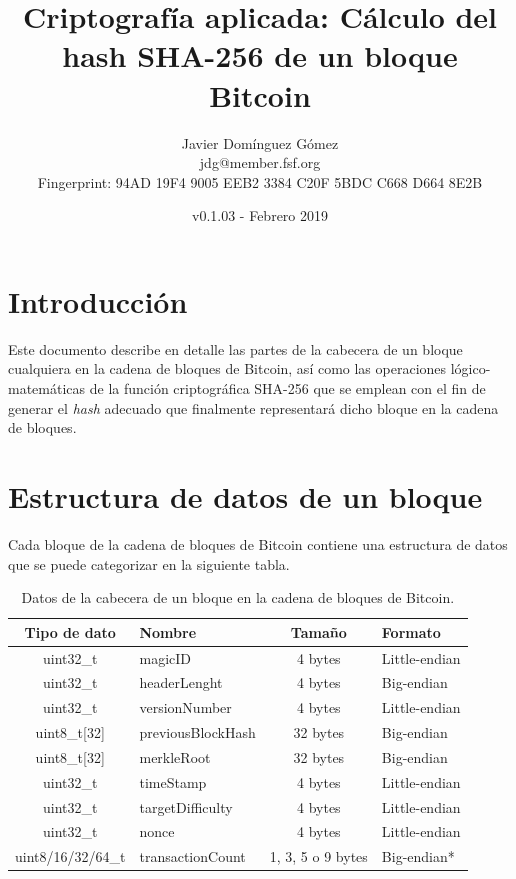 \documentclass{article}
\title{\textbf{Criptografía aplicada: Cálculo del hash SHA-256 de un bloque Bitcoin}}
\author{Javier Domínguez Gómez \\
\small{jdg@member.fsf.org} \\
\small{Fingerprint: 94AD 19F4 9005 EEB2 3384 C20F 5BDC C668 D664 8E2B}}
\date{v0.1.03 - Febrero 2019}
\begin{document}
\maketitle

\tableofcontents{}

\section{Introducción}
    Este documento describe en detalle las partes de la cabecera de un bloque cualquiera en la cadena de bloques de Bitcoin, así como las operaciones lógico-matemáticas de la función criptográfica SHA-256 que se emplean con el fin de generar el \textit{hash} adecuado que finalmente representará dicho bloque en la cadena de bloques.

\section{Estructura de datos de un bloque}
    \vspace{3mm}
    Cada bloque de la cadena de bloques de Bitcoin contiene una estructura de datos que se puede categorizar en la siguiente tabla.
    \begin{table}[H]
    \centering
    \begin{tabular}{| c | l | c | l |} 
        \hline
        Tipo de dato & Nombre & Tamaño & Formato \\
        \hline
        uint32\_t & magicID & 4 bytes & Little-endian \\
        \hline
        uint32\_t & headerLenght & 4 bytes & Big-endian \\
        \hline
        uint32\_t & versionNumber & 4 bytes & Little-endian \\
        \hline
        uint8\_t[32] & previousBlockHash & 32 bytes & Big-endian \\
        \hline
        uint8\_t[32] & merkleRoot & 32 bytes & Big-endian \\
        \hline
        uint32\_t & timeStamp & 4 bytes & Little-endian \\
        \hline
        uint32\_t & targetDifficulty & 4 bytes & Little-endian \\
        \hline
        uint32\_t & nonce & 4 bytes & Little-endian \\
        \hline
        uint8/16/32/64\_t & transactionCount & 1, 3, 5 o 9 bytes & Big-endian*  \\
        \hline
    \end{tabular}
    \caption{Datos de la cabecera de un bloque en la cadena de bloques de Bitcoin.}
    \label{table:0}
    \end{table}
    
\end{document}
